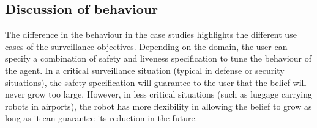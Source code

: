 \subsection{Discussion of behaviour}
The difference in the behaviour in the case studies highlights the different use cases of the surveillance objectives. Depending on the domain, the user can specify a combination of safety and liveness specification to tune the behaviour of the agent. In a critical surveillance situation (typical in defense or security situations), the safety specification will guarantee to the user that the belief will never grow too large. However, in less critical situations (such as luggage carrying robots in airports), the robot has more flexibility in allowing the belief to grow as long as it can guarantee its reduction in the future. 